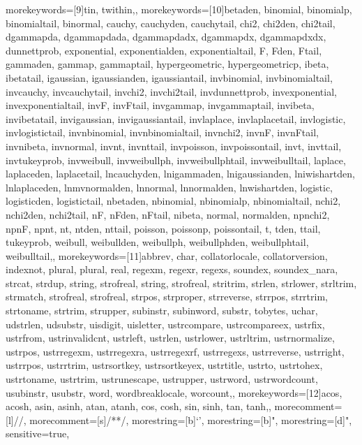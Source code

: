 {    %
    morekeywords=[9]{tin, twithin,},
    morekeywords=[10]{betaden, binomial, binomialp, binomialtail, binormal, cauchy, cauchyden, cauchytail, chi2, chi2den, chi2tail, dgammapda, dgammapdada, dgammapdadx, dgammapdx, dgammapdxdx, dunnettprob, exponential, exponentialden, exponentialtail, F, Fden, Ftail, gammaden, gammap, gammaptail, hypergeometric, hypergeometricp, ibeta, ibetatail, igaussian, igaussianden, igaussiantail, invbinomial, invbinomialtail, invcauchy, invcauchytail, invchi2, invchi2tail, invdunnettprob, invexponential, invexponentialtail, invF, invFtail, invgammap, invgammaptail, invibeta, invibetatail, invigaussian, invigaussiantail, invlaplace, invlaplacetail, invlogistic, invlogistictail, invnbinomial, invnbinomialtail, invnchi2, invnF, invnFtail, invnibeta, invnormal, invnt, invnttail, invpoisson, invpoissontail, invt, invttail, invtukeyprob, invweibull, invweibullph, invweibullphtail, invweibulltail, laplace, laplaceden, laplacetail, lncauchyden, lnigammaden, lnigaussianden, lniwishartden, lnlaplaceden, lnmvnormalden, lnnormal, lnnormalden, lnwishartden, logistic, logisticden, logistictail, nbetaden, nbinomial, nbinomialp, nbinomialtail, nchi2, nchi2den, nchi2tail, nF, nFden, nFtail, nibeta, normal, normalden, npnchi2, npnF, npnt, nt, ntden, nttail, poisson, poissonp, poissontail, t, tden, ttail, tukeyprob, weibull, weibullden, weibullph, weibullphden, weibullphtail, weibulltail,},
    morekeywords=[11]{abbrev, char, collatorlocale, collatorversion, indexnot, plural, plural, real, regexm, regexr, regexs, soundex, soundex_nara, strcat, strdup, string, strofreal, string, strofreal, stritrim, strlen, strlower, strltrim, strmatch, strofreal, strofreal, strpos, strproper, strreverse, strrpos, strrtrim, strtoname, strtrim, strupper, subinstr, subinword, substr, tobytes, uchar, udstrlen, udsubstr, uisdigit, uisletter, ustrcompare, ustrcompareex, ustrfix, ustrfrom, ustrinvalidcnt, ustrleft, ustrlen, ustrlower, ustrltrim, ustrnormalize, ustrpos, ustrregexm, ustrregexra, ustrregexrf, ustrregexs, ustrreverse, ustrright, ustrrpos, ustrrtrim, ustrsortkey, ustrsortkeyex, ustrtitle, ustrto, ustrtohex, ustrtoname, ustrtrim, ustrunescape, ustrupper, ustrword, ustrwordcount, usubinstr, usubstr, word, wordbreaklocale, worcount,},
    morekeywords=[12]{acos, acosh, asin, asinh, atan, atanh, cos, cosh, sin, sinh, tan, tanh,},
    morecomment=[l]{//},
    morecomment=[s]{/*}{*/},
    morestring=[b]{`}{'},
    morestring=[b]",
    morestring=[d]",
    sensitive=true,
}
